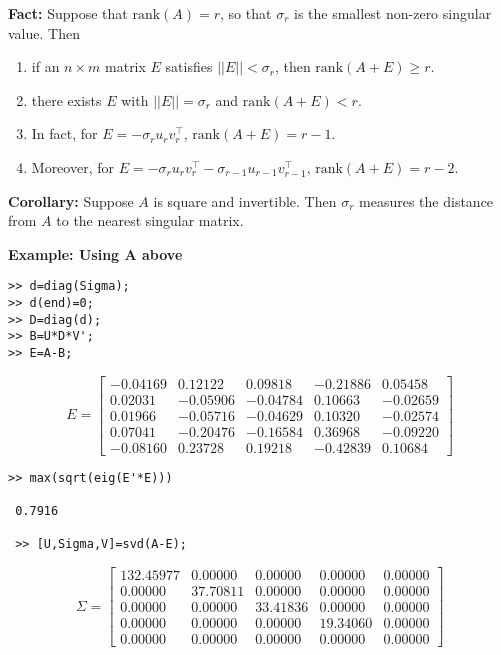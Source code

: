 \documentclass[letterpaper]{article}
\begin{document}
\textbf{Fact:} Suppose that $\text{rank}(A) = r$, so that $\sigma_r$ is the smallest non-zero singular value. Then

\begin{enumerate}
\setlength{\itemsep}{.1in}
\renewcommand{\labelenumi}{(\roman{enumi})}
\item if an $n \times m$ matrix $E$ satisfies $||E|| < \sigma_r$, then $\text{rank} (A+E)\ge r.$

\item there exists $E$ with $||E|| = \sigma_r$ and $\text{rank}(A+E) < r$.

\item In fact, for $E=-\sigma_r u_r v_r^\top$,  $\text{rank}(A+E) =r-1$.

\item Moreover, for $E=-\sigma_r u_r v_r^\top - \sigma_{r-1} u_{r-1} v_{r-1}^\top$,  $\text{rank}(A+E) =r-2$.
\end{enumerate}

\textbf{Corollary:}  Suppose $A$ is square and invertible. Then $\sigma_r$ measures the distance from $A$ to the nearest singular matrix.

\newpage

\textbf{Example: Using A above}

\begin{verbatim}
>> d=diag(Sigma);
>> d(end)=0;
>> D=diag(d);
>> B=U*D*V';
>> E=A-B;
\end{verbatim}
$$E=\left[
\begin{array}{rrrrr}-0.04169& 0.12122& 0.09818& -0.21886& 0.05458\\0.02031& -0.05906& -0.04784& 0.10663& -0.02659\\0.01966& -0.05716& -0.04629& 0.10320& -0.02574\\0.07041& -0.20476& -0.16584& 0.36968& -0.09220\\-0.08160& 0.23728& 0.19218& -0.42839& 0.10684\end{array} \right]$$

\begin{verbatim}
>> max(sqrt(eig(E'*E)))

 0.7916

 >> [U,Sigma,V]=svd(A-E);
\end{verbatim}

$$\Sigma=\left[ \begin{array}{rrrrr}132.45977& 0.00000&0.00000&0.00000&0.00000\\0.00000&37.70811& 0.00000&0.00000&0.00000\\0.00000&0.00000&33.41836& 0.00000&0.00000\\0.00000&0.00000&0.00000&19.34060& 0.00000\\0.00000& 0.00000& 0.00000& 0.00000& 0.00000\end{array} \right] $$
\end{document}

